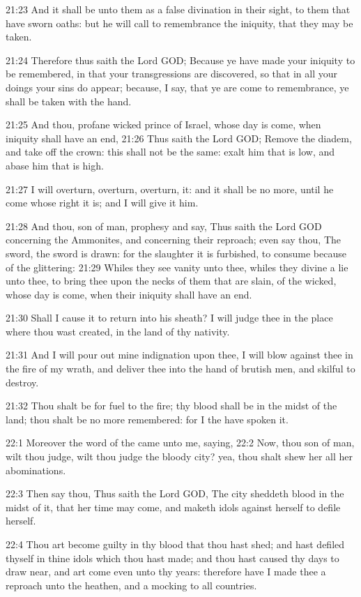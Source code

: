 21:23 And it shall be unto them as a false divination in their sight, to them that have sworn oaths: but he will call to remembrance the iniquity, that they may be taken.

21:24 Therefore thus saith the Lord GOD; Because ye have made your iniquity to be remembered, in that your transgressions are discovered, so that in all your doings your sins do appear; because, I say, that ye are come to remembrance, ye shall be taken with the hand.

21:25 And thou, profane wicked prince of Israel, whose day is come, when iniquity shall have an end, 21:26 Thus saith the Lord GOD; Remove the diadem, and take off the crown: this shall not be the same: exalt him that is low, and abase him that is high.

21:27 I will overturn, overturn, overturn, it: and it shall be no more, until he come whose right it is; and I will give it him.

21:28 And thou, son of man, prophesy and say, Thus saith the Lord GOD concerning the Ammonites, and concerning their reproach; even say thou, The sword, the sword is drawn: for the slaughter it is furbished, to consume because of the glittering: 21:29 Whiles they see vanity unto thee, whiles they divine a lie unto thee, to bring thee upon the necks of them that are slain, of the wicked, whose day is come, when their iniquity shall have an end.

21:30 Shall I cause it to return into his sheath? I will judge thee in the place where thou wast created, in the land of thy nativity.

21:31 And I will pour out mine indignation upon thee, I will blow against thee in the fire of my wrath, and deliver thee into the hand of brutish men, and skilful to destroy.

21:32 Thou shalt be for fuel to the fire; thy blood shall be in the midst of the land; thou shalt be no more remembered: for I the \LORD have spoken it.

22:1 Moreover the word of the \LORD came unto me, saying, 22:2 Now, thou son of man, wilt thou judge, wilt thou judge the bloody city?  yea, thou shalt shew her all her abominations.

22:3 Then say thou, Thus saith the Lord GOD, The city sheddeth blood in the midst of it, that her time may come, and maketh idols against herself to defile herself.

22:4 Thou art become guilty in thy blood that thou hast shed; and hast defiled thyself in thine idols which thou hast made; and thou hast caused thy days to draw near, and art come even unto thy years: therefore have I made thee a reproach unto the heathen, and a mocking to all countries.

